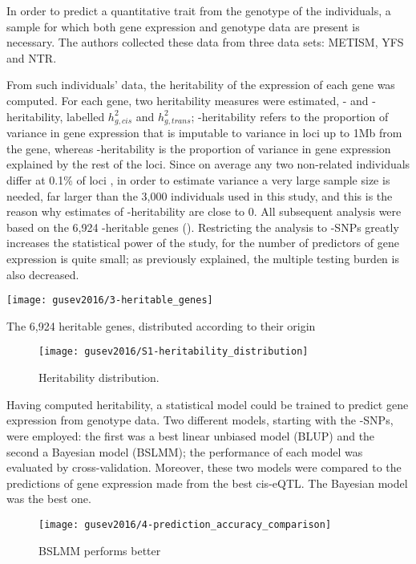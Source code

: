 \documentclass[../main.tex]{subfiles}
\begin{document}
In order to predict a quantitative trait from the genotype of the 
individuals, a sample for which both gene expression and genotype data 
are present is necessary. The authors collected these data from three 
data sets: METISM, YFS and NTR.

From such individuals' data, the heritability of the expression of each 
gene was computed. For each gene, two heritability measures were 
estimated, \cis- and \trans- heritability, labelled $h_{g,cis}^2$ and 
$h_{g,trans}^2$; \cis-heritability refers to the proportion of variance 
in gene expression that is imputable to variance in loci up to 1Mb from 
the gene, whereas \trans-heritability is the proportion of variance in 
gene expression explained by the rest of the loci. Since on average any 
two non-related individuals differ at 0.1\% of loci , in order to estimate \trans variance a very large sample size 
is needed, far larger than the 3,000 individuals used in this study, and 
this is the reason why estimates of \trans-heritability are close to 0. 
All subsequent analysis were based on the 6,924 \cis-heritable genes 
(). Restricting the analysis to \cis-SNPs greatly 
increases the statistical power of the study, for the number of 
predictors of gene expression is quite small; as previously explained, 
the multiple testing burden is also decreased.

\begin{marginfigure}[-4cm]
	\texttt{[image: gusev2016/3-heritable\_genes]}
	\caption{The 6,924 heritable genes, distributed according to their 
origin}
\end{marginfigure}

\begin{figure}
	\texttt{[image: gusev2016/S1-heritability\_distribution]}
	\caption{Heritability distribution.}
\end{figure}

Having computed heritability, a statistical model could be trained to 
predict gene expression from genotype data. Two different models, 
starting with the \cis-SNPs, were employed: the first was a best linear 
unbiased model (BLUP) and the second a Bayesian model (BSLMM); the 
performance of each model was evaluated by cross-validation. Moreover, 
these two models were compared to the predictions of gene expression 
made from the best cis-eQTL. The Bayesian model was the best one.

\begin{figure}
	\texttt{[image: gusev2016/4-prediction\_accuracy\_comparison]}
	\caption{BSLMM performs better}
\end{figure}
\end{document}

